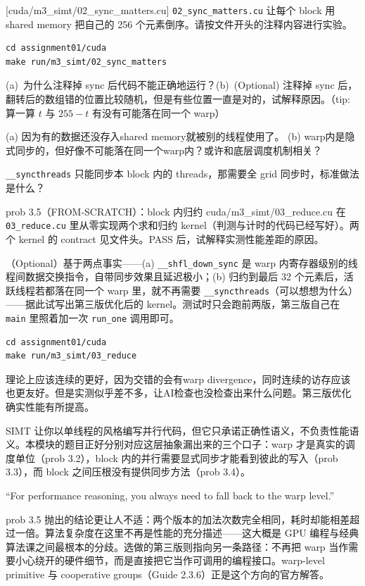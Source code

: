 \documentclass[11pt,a4paper,fontset=none]{ctexart}
\begin{document}
[cuda/m3\_simt/02\_sync\_matters.cu]
\texttt{02\_sync\_matters.cu} 让每个 block 用 shared memory 把自己的 256 个元素倒序。请按文件开头的注释内容进行实验。

\begin{lstlisting}
cd assignment01/cuda
make run/m3_simt/02_sync_matters
\end{lstlisting}

(a)~为什么注释掉 sync 后代码不能正确地运行？(b)~(Optional) 注释掉 sync 后，翻转后的数组错的位置比较随机，但是有些位置一直是对的，试解释原因。（tip: 算一算 $t$ 与 $255-t$ 有没有可能落在同一个 warp）

(a) 因为有的数据还没存入shared memory就被别的线程使用了。 (b) warp内是隐式同步的，但好像不可能落在同一个warp内？或许和底层调度机制相关？

\texttt{\_\_syncthreads} 只能同步本 block 内的 threads，那需要全 grid 同步时，标准做法是什么？

\begin{capstone}{prob 3.5（FROM-SCRATCH）：block 内归约 \hfill {\footnotesize\ttfamily cuda/m3\_simt/03\_reduce.cu}}
在 \texttt{03\_reduce.cu} 里从零实现两个求和归约 kernel（判测与计时的代码已经写好）。两个 kernel 的 contract 见文件头。PASS 后，试解释实测性能差距的原因。

（Optional）基于两点事实——(a) \texttt{\_\_shfl\_down\_sync} 是 warp 内寄存器级别的线程间数据交换指令，自带同步效果且延迟极小；(b) 归约到最后 32 个元素后，活跃线程若都落在同一个 warp 里，就不再需要 \texttt{\_\_syncthreads}（可以想想为什么）——据此试写出第三版优化后的 kernel。测试时只会跑前两版，第三版自己在 \texttt{main} 里照着加一次 \texttt{run\_one} 调用即可。
\end{capstone}

\begin{lstlisting}
cd assignment01/cuda
make run/m3_simt/03_reduce
\end{lstlisting}

理论上应该连续的更好，因为交错的会有warp divergence，同时连续的访存应该也更友好。但是实测似乎差不多，让AI检查也没检查出来什么问题。第三版优化确实性能有所提高。

\begin{lookback}
SIMT 让你以单线程的风格编写并行代码，但它只承诺正确性语义，不负责性能语义。本模块的题目正好分别对应这层抽象漏出来的三个口子：warp 才是真实的调度单位（prob 3.2），block 内的并行需要显式同步才能看到彼此的写入（prob 3.3），而 block 之间压根没有提供同步方法（prob 3.4）。

``For performance reasoning, you always need to fall back to the warp level.''

prob 3.5 抛出的结论更让人不适：两个版本的加法次数完全相同，耗时却能相差超过一倍。算法复杂度在这里不再是性能的充分描述——这大概是 GPU 编程与经典算法课之间最根本的分歧。选做的第三版则指向另一条路径：不再把 warp 当作需要小心绕开的硬件细节，而是直接把它当作可调用的编程接口。warp-level primitive 与 cooperative groups（Guide 2.3.6）正是这个方向的官方解答。
\end{lookback}
\end{document}
